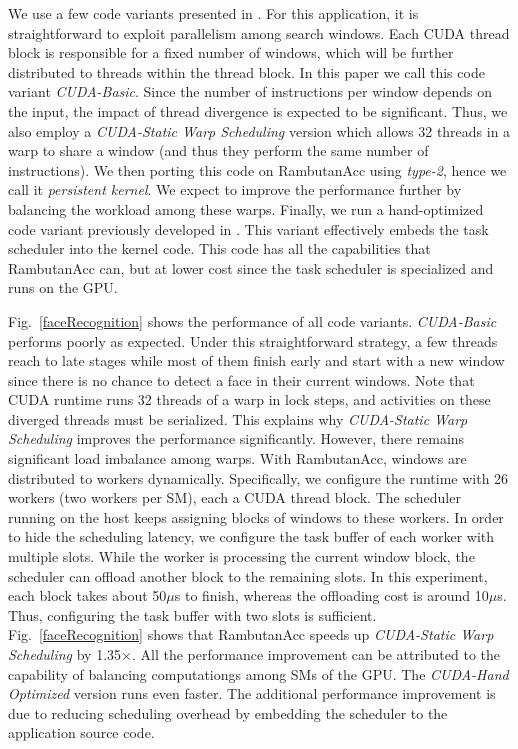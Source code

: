 We use a few code variants presented in \cite{facedetection_dws}.
For this application, it is straightforward to exploit parallelism among search windows.
Each CUDA thread block is responsible for a fixed number of windows, which will be further distributed to threads within the thread block.
In this paper we call this code variant {\em CUDA-Basic}.
Since the number of instructions per window depends on the input, the impact of thread divergence is expected to be significant.
Thus, we also employ a {\em CUDA-Static Warp Scheduling} version which allows 32 threads in a warp to share a window (and thus they perform the same number of instructions).
We then porting this code on RambutanAcc using {\em type-2}, hence we call it {\em persistent kernel}.
We expect to improve the performance further by balancing the workload among these warps.
Finally, we run a hand-optimized code variant previously developed in \cite{facedetection_dws}.
This variant effectively embeds the task scheduler into the kernel code.
This code has all the capabilities that RambutanAcc can, but at lower cost since the task scheduler is specialized and runs on the GPU.

Fig.~\ref{faceRecognition} shows the performance of all code variants.
{\em CUDA-Basic} performs poorly as expected.
Under this straightforward strategy, a few threads reach to late stages while most of them finish early and start with a new window since there is no chance to detect a face in their current windows.
Note that CUDA runtime runs 32 threads of a warp in lock steps, and activities on these diverged threads must be serialized. 
This explains why {\em CUDA-Static Warp Scheduling} improves the performance significantly.
However, there remains significant load imbalance among warps.
With RambutanAcc, windows are distributed to workers dynamically.
Specifically, we configure the runtime with 26 workers (two workers per SM), each a CUDA thread block. 
The scheduler running on the host keeps assigning blocks of windows to these workers.
In order to hide the scheduling latency, we configure the task buffer of each worker with multiple slots.
While the worker is processing the current window block, the scheduler can offload another block to the remaining slots.
In this experiment, each block takes about 50$\mu$s to finish, whereas the offloading cost is around 10$\mu$s.
Thus, configuring the task buffer with two slots is sufficient.
Fig.~\ref{faceRecognition} shows that RambutanAcc speeds up {\em CUDA-Static Warp Scheduling} by 1.35$\times$.
All the performance improvement can be attributed to the capability of balancing computationgs among SMs of the GPU.
The {\em CUDA-Hand Optimized} version runs even faster.
The additional performance improvement is due to reducing scheduling overhead by embedding the scheduler to the application source code.


